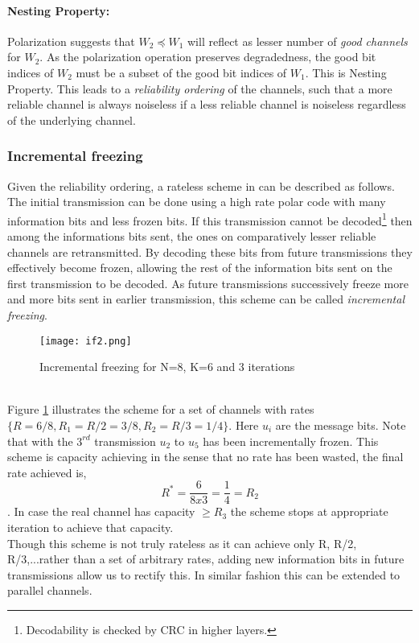 \documentclass[
11pt, %
a4paper, %
oneside, %
headinclude,footinclude, %
BCOR5mm, %
]{scrartcl}
\begin{document}
\paragraph{Nesting Property:}Polarization suggests that $W_2 \preceq W_1$ will reflect as lesser number of \emph{good channels} for $W_2$. As the polarization operation preserves degradedness\cite{wang}, the good bit indices of $W_2$ must be a subset of the good bit indices of $W_1$. This is Nesting Property. This leads to a \emph{reliability ordering} of the channels, such that a more reliable channel is always noiseless if a less reliable channel is noiseless regardless of the underlying channel.
\subsubsection{Incremental freezing}\label{if}
Given the reliability ordering, a rateless scheme in \cite{chen} can be described as follows. The initial transmission can be done using a high rate polar code with many information bits and less frozen bits. If this transmission cannot be decoded\footnote{Decodability is checked by CRC in higher layers.} then among the informations bits sent, the ones on comparatively lesser reliable channels are retransmitted. By decoding these bits from future transmissions they effectively become frozen, allowing the rest of the information bits sent on the first transmission to be decoded.  As future transmissions successively freeze more and more bits sent in earlier transmission, this scheme can be called \emph{incremental freezing}.
\begin{figure}[h]
 \begin{center}
    \texttt{[image: if2.png]}
  \end{center}
  \caption{Incremental freezing for N=8, K=6 and 3 iterations}
  \label{fig:if}
\end{figure}  
\\Figure \ref{fig:if} illustrates the scheme for a set of channels with rates $\{ R=6/8, R_1= R/2=3/8,R_2= R/3=1/4\}$. Here $u_i$ are the message bits. Note that with the $3^{rd}$ transmission  $u_2$ to $u_{5}$ has been incrementally frozen. This scheme is capacity achieving in the sense that no rate has been wasted, the final rate achieved is, $$R^*= \frac{6}{8x3}=\frac{1}{4}=R_2 $$. In case the real channel has capacity $ \geq R_3$ the scheme stops at appropriate iteration to achieve that capacity.\\
Though this scheme is not truly rateless as it can achieve only R, R/2, R/3,...rather than a set of arbitrary rates, adding new information bits in future transmissions allow us to rectify this. In similar fashion this can be extended to parallel channels.\\
\end{document}
